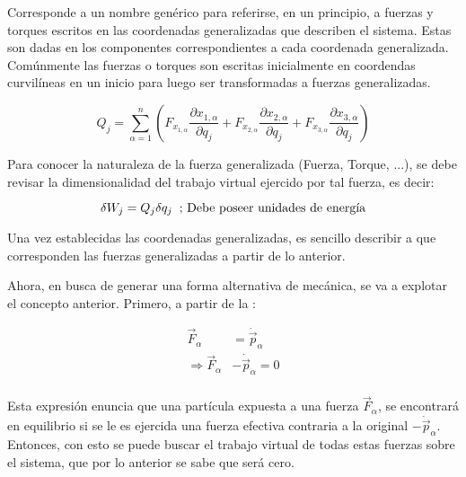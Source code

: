 \documentclass[/home/hernan/Documentos/Apuntes_mecanica_teorica/main.tex]{subfiles}
\begin{document}
    \begin{definition} 
        Corresponde a un nombre genérico para referirse, en un principio, a fuerzas y torques escritos en las coordenadas generalizadas que describen el sistema. Estas son dadas en los componentes correspondientes a cada coordenada generalizada. Comúnmente las fuerzas o torques son escritas inicialmente en coordendas curvilíneas en un inicio para luego ser transformadas a fuerzas generalizadas.

        \begin{equation}
            Q_{j} = \sum_{\alpha=1}^{n} \left( F_{x_{1,\alpha}} \frac{\partial x_{1,\alpha}}{\partial q_{j}} +   F_{x_{2,\alpha}} \frac{\partial x_{2,\alpha}}{\partial q_{j}} + F_{x_{3,\alpha}} \frac{\partial x_{3,\alpha}}{\partial q_{j}} \right)
            \label{eq: fuerzasgeneralizadas}
        \end{equation}

        Para conocer la naturaleza de la fuerza generalizada (Fuerza, Torque, ...), se debe revisar la dimensionalidad del trabajo virtual ejercido por tal fuerza, es decir:

        \begin{equation*}
            \delta W_{j} = Q_{j} \delta q_{j} \; \; \textup{; Debe poseer unidades de energía}
        \end{equation*}

        Una vez establecidas las coordenadas generalizadas, es sencillo describir a que corresponden las fuerzas generalizadas a partir de lo anterior.
        
    \end{definition}
    
    Ahora, en busca de generar una forma alternativa de mecánica, se va a explotar el concepto anterior. Primero, a partir de la :

    \begin{align*}
        \vec{F}_{\alpha} &= \dot{\vec{p}}_{\alpha} \\ 
        \Rightarrow \vec{F}_{\alpha} &- \dot{\vec{p}}_{\alpha} = 0 \\ 
    \end{align*}

    Esta expresión enuncia que una partícula expuesta a una fuerza $ \vec{F}_{\alpha}$, se encontrará en equilibrio si se le es ejercida una fuerza efectiva contraria a la original $- \dot{\vec{p}}_{\alpha}$. Entonces, con esto se puede buscar el trabajo virtual de todas estas fuerzas sobre el sistema, que por lo anterior se sabe que será cero.
\end{document}
